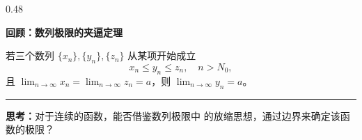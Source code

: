 \documentclass[notheorems]{beamer}
\begin{document}
\begin{frame}
\begin{columns}[T, totalwidth=\linewidth]
\begin{column}{0.48\linewidth}
{\begin{tcolorbox}[
						colback=white, colframe=structure.fg!50,
						arc=3pt, boxrule=0.5pt,
						top=6pt, bottom=6pt, left=8pt, right=8pt]
{							%
							\textbf{回顾：数列极限的夹逼定理}
							
							\par\vspace{5pt}
							若三个数列 $\{x_n\},\{y_n\},\{z_n\}$ 从某项开始成立
							{\setlength{\abovedisplayskip}{2pt}
								\setlength{\belowdisplayskip}{2pt}
								\[
								x_n \leq y_n \leq z_n,\quad n > N_0,
								\]}
							且 $\lim_{n\to\infty}x_n = \lim_{n\to\infty}z_n = a$，则 $\lim_{n\to\infty}y_n = a$。
							
							\par\vspace{3pt}
							\textcolor{structure.fg!60}{\rule{\linewidth}{0.4pt}}
							\par\vspace{3pt}
							
							\textbf{思考：}对于连续的函数，能否借鉴数列极限中
							的放缩思想，通过边界来确定该函数的极限？
						}
					\end{tcolorbox}
				}
			\end{column}
			
		\end{columns}
		
	\end{frame}
	
	
\end{document}
